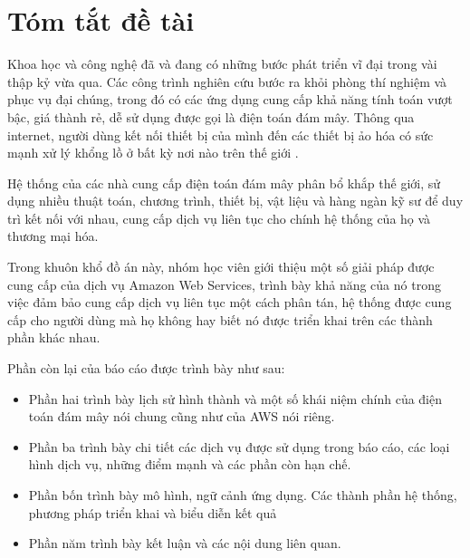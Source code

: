 \section{Tóm tắt đề tài}
\label{summary}

Khoa học và công nghệ đã và đang có những bước phát triển vĩ đại trong vài thập kỷ vừa qua. Các công trình nghiên cứu bước ra khỏi phòng thí nghiệm và phục vụ đại chúng, trong đó có các ứng dụng cung cấp khả năng tính toán vượt bậc, giá thành rẻ, dễ sử dụng được gọi là điện toán đám mây. Thông qua internet, người dùng kết nối thiết bị của mình đến các thiết bị ảo hóa có sức mạnh xử lý khổng lồ ở bất kỳ nơi nào trên thế giới \cite{furht2010handbook}.

Hệ thống của các nhà cung cấp điện toán đám mây phân bổ khắp thế giới, sử dụng nhiều thuật toán, chương trình, thiết bị, vật liệu và hàng ngàn kỹ sư để duy trì kết nối với nhau, cung cấp dịch vụ liên tục cho chính hệ thống của họ và thương mại hóa.

Trong khuôn khổ đồ án này, nhóm học viên giới thiệu một số giải pháp được cung cấp của dịch vụ Amazon Web Services, trình bày khả năng của nó trong việc đảm bảo cung cấp dịch vụ liên tục một cách phân tán, hệ thống được cung cấp cho người dùng mà họ không hay biết nó được triển khai trên các thành phần khác nhau. 

Phần còn lại của báo cáo được trình bày như sau:
\begin{itemize}
    \item Phần hai trình bày lịch sử hình thành và một số khái niệm chính của điện toán đám mây nói chung cũng như của AWS nói riêng.
    \item Phần ba trình bày chi tiết các dịch vụ được sử dụng trong báo cáo, các loại hình dịch vụ, những điểm mạnh và các phần còn hạn chế.
    \item Phần bốn trình bày mô hình, ngữ cảnh ứng dụng. Các thành phần hệ thống, phương pháp triển khai và biểu diễn kết quả
    \item Phần năm trình bày kết luận và các nội dung liên quan.
\end{itemize}
